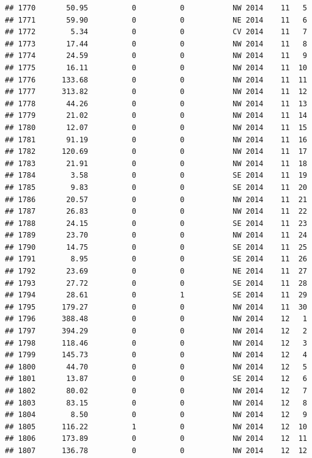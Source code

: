 \documentclass[
]{article}
\begin{document}
\begin{verbatim}
## 1770       50.95          0          0           NW 2014    11   5
## 1771       59.90          0          0           NE 2014    11   6
## 1772        5.34          0          0           CV 2014    11   7
## 1773       17.44          0          0           NW 2014    11   8
## 1774       24.59          0          0           NW 2014    11   9
## 1775       16.11          0          0           NW 2014    11  10
## 1776      133.68          0          0           NW 2014    11  11
## 1777      313.82          0          0           NW 2014    11  12
## 1778       44.26          0          0           NW 2014    11  13
## 1779       21.02          0          0           NW 2014    11  14
## 1780       12.07          0          0           NW 2014    11  15
## 1781       91.19          0          0           NW 2014    11  16
## 1782      120.69          0          0           NW 2014    11  17
## 1783       21.91          0          0           NW 2014    11  18
## 1784        3.58          0          0           SE 2014    11  19
## 1785        9.83          0          0           SE 2014    11  20
## 1786       20.57          0          0           NW 2014    11  21
## 1787       26.83          0          0           NW 2014    11  22
## 1788       24.15          0          0           SE 2014    11  23
## 1789       23.70          0          0           NW 2014    11  24
## 1790       14.75          0          0           SE 2014    11  25
## 1791        8.95          0          0           SE 2014    11  26
## 1792       23.69          0          0           NE 2014    11  27
## 1793       27.72          0          0           SE 2014    11  28
## 1794       28.61          0          1           SE 2014    11  29
## 1795      179.27          0          0           NW 2014    11  30
## 1796      388.48          0          0           NW 2014    12   1
## 1797      394.29          0          0           NW 2014    12   2
## 1798      118.46          0          0           NW 2014    12   3
## 1799      145.73          0          0           NW 2014    12   4
## 1800       44.70          0          0           NW 2014    12   5
## 1801       13.87          0          0           SE 2014    12   6
## 1802       80.02          0          0           NW 2014    12   7
## 1803       83.15          0          0           NW 2014    12   8
## 1804        8.50          0          0           NW 2014    12   9
## 1805      116.22          1          0           NW 2014    12  10
## 1806      173.89          0          0           NW 2014    12  11
## 1807      136.78          0          0           NW 2014    12  12

\end{verbatim}
\end{document}
